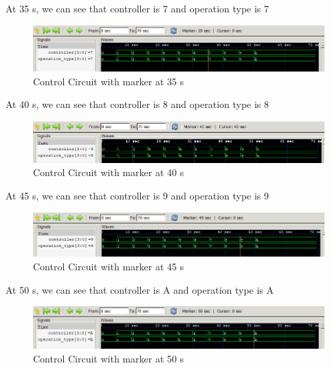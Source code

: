 \documentclass[12pt]{article}
\begin{document}
At 35 s, we can see that controller is 7 and operation type is 7
\begin{figure}[h]
    \centering
    \includegraphics[width = 1.0\textwidth]{figs/CCirc35.png}
    \caption{Control Circuit with marker at 35 s}
    \label{fig:enter-label}
\end{figure}

At 40 s, we can see that controller is 8 and operation type is 8
\begin{figure}[h]
    \centering
    \includegraphics[width = 1.0\textwidth]{figs/CCirc40.png}
    \caption{Control Circuit with marker at 40 s}
    \label{fig:enter-label}
\end{figure}

\newpage

At 45 s, we can see that controller is 9 and operation type is 9
\begin{figure}[h]
    \centering
    \includegraphics[width = 1.0\textwidth]{figs/CCirc45.png}
    \caption{Control Circuit with marker at 45 s}
    \label{fig:enter-label}
\end{figure}

At 50 s, we can see that controller is A and operation type is A
\begin{figure}[h]
    \centering
    \includegraphics[width = 1.0\textwidth]{figs/CCirc50.png}
    \caption{Control Circuit with marker at 50 s}
    \label{fig:enter-label}
\end{figure}
\end{document}
